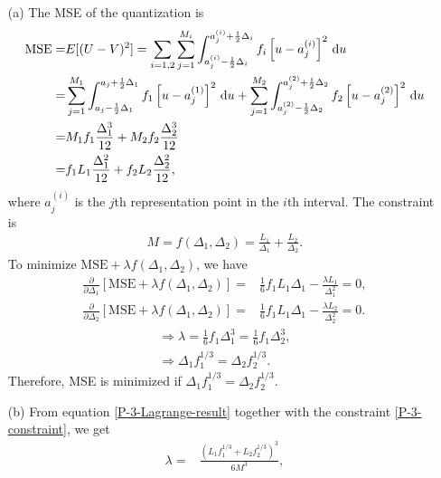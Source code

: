 \documentclass{assignment}
\begin{document}
\begin{sol}
    \begin{itemize}
        \item[(a)] The MSE of the quantization is
        \begin{align}
            \label{P-3-MSE}
            \notag\text{MSE}=&E[(U-V)^2]=\sum_{i=1,2}\sum_{j=1}^{M_i}\int_{a_j^{(i)}-\frac{1}{2}\Delta_i}^{a_j^{(i)}+\frac{1}{2}\Delta_i}f_i\left[u-a_j^{(i)}\right]^2\,\mathrm{d}u\\
            \notag=&\sum_{j=1}^{M_1}\int_{a_j-\frac{1}{2}\Delta_1}^{a_j+\frac{1}{2}\Delta_1}f_1\left[u-a_j^{(1)}\right]^2\,\mathrm{d}u+\sum_{j=1}^{M_2}\int_{a_j^{(2)}-\frac{1}{2}\Delta_2}^{a_j^{(2)}+\frac{1}{2}\Delta_2}f_2\left[u-a_j^{(2)}\right]^2\,\mathrm{d}u\\
            \notag=&M_1f_1\frac{\Delta_1^3}{12}+M_2f_2\frac{\Delta_2^3}{12}\\
            =&f_1L_1\frac{\Delta_1^2}{12}+f_2L_2\frac{\Delta_2^2}{12},
        \end{align}
        where $a_j^{(i)}$ is the $j$th representation point in the $i$th interval.
        The constraint is
        \begin{align}
            \label{P-3-constraint}
            M=f(\Delta_1,\Delta_2)=\frac{L_1}{\Delta_1}+\frac{L_2}{\Delta_2}.
        \end{align}
        To minimize $\text{MSE}+\lambda f(\Delta_1,\Delta_2)$, we have
        \begin{align}
            \frac{\partial}{\partial\Delta_1}[\text{MSE}+\lambda f(\Delta_1,\Delta_2)]=&\frac{1}{6}f_1L_1\Delta_1-\frac{\lambda L_1}{\Delta_1^2}=0,\\
            \frac{\partial}{\partial\Delta_2}[\text{MSE}+\lambda f(\Delta_1,\Delta_2)]=&\frac{1}{6}f_1L_1\Delta_1-\frac{\lambda L_2}{\Delta_2^2}=0.
        \end{align}
        \begin{gather}
            \label{P-3-Lagrange-result}\Longrightarrow\lambda=\frac{1}{6}f_1\Delta_1^3=\frac{1}{6}f_1\Delta_2^3,\\
            \Longrightarrow\Delta_1f_1^{1/3}=\Delta_2f_2^{1/3}.
        \end{gather}
        Therefore, MSE is minimized if $\Delta_1f_1^{1/3}=\Delta_2f_2^{1/3}$.
        \item[(b)] From equation \ref{P-3-Lagrange-result} together with the constraint \ref{P-3-constraint}, we get
        \begin{align}
            \lambda=&\frac{(L_1f_1^{1/3}+L_2f_2^{1/3})^3}{6M^3},\\

\end{align}
\end{itemize}
\end{sol}
\end{document}
